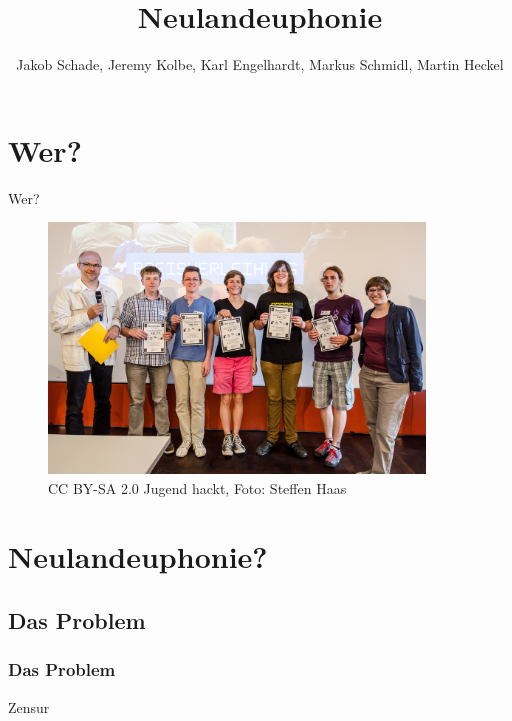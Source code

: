 \documentclass [xcolor=dvipsnames] {beamer}
\title {\sc Neulandeuphonie}
\author {Jakob Schade, Jeremy Kolbe, Karl Engelhardt, Markus Schmidl, Martin Heckel}
\begin{document}
\begin{frame}
	\titlepage
\end{frame}

\begin{frame}
	\tableofcontents
\end{frame}

\section{Wer?}
\begin{frame}
	\begin{center}
		{\Huge Wer?}
	\end{center}
\end{frame}
\begin{frame}
	\begin{figure}
		\includegraphics[width=10cm]{jhost2015abschluss}
		\caption{CC BY-SA 2.0 Jugend hackt, Foto: Steffen Haas}
	\end{figure}
\end{frame}

\section{Neulandeuphonie?}
\subsection{Das Problem}
\begin{frame}
	\frametitle{\sc Das Problem}
	\begin{center}
		{\Huge Zensur}
	\end{center}
\end{frame}
\end{document}
